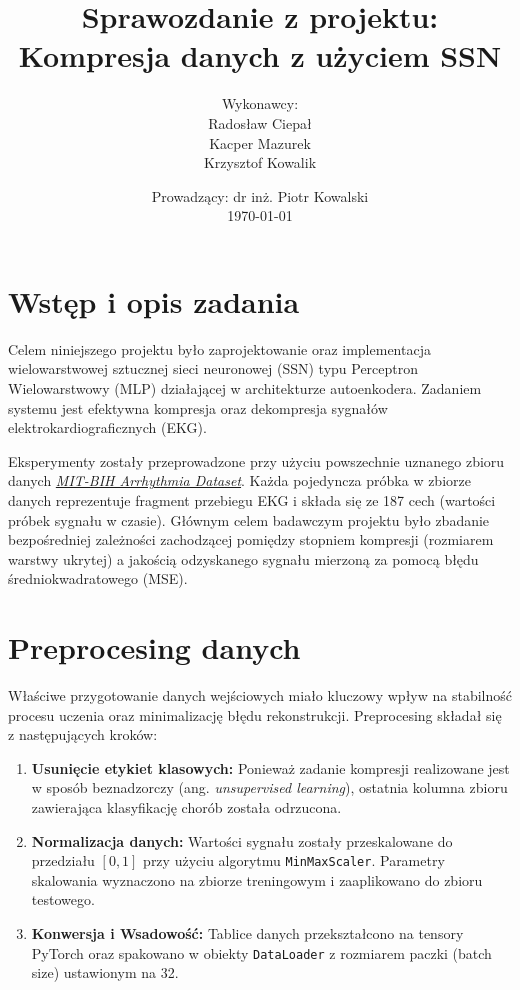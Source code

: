 \documentclass[12pt,a4paper]{article}
\title{Sprawozdanie z projektu:\\Kompresja danych z użyciem SSN}
\author{Wykonawcy: \\
    Radosław Ciepał \\
    Kacper Mazurek \\
    Krzysztof Kowalik}
\date{Prowadzący: dr inż. Piotr Kowalski \\ \today}
\begin{document}
\maketitle
\newpage
\tableofcontents
\newpage

\section{Wstęp i opis zadania}
Celem niniejszego projektu było zaprojektowanie oraz implementacja wielowarstwowej sztucznej sieci neuronowej (SSN) typu Perceptron Wielowarstwowy (MLP) działającej w architekturze autoenkodera. Zadaniem systemu jest efektywna kompresja oraz dekompresja sygnałów elektrokardiograficznych (EKG).

Eksperymenty zostały przeprowadzone przy użyciu powszechnie uznanego zbioru danych \href{https://www.kaggle.com/datasets/shayanfazeli/heartbeat}{\textit{MIT-BIH Arrhythmia Dataset}}. Każda pojedyncza próbka w zbiorze danych reprezentuje fragment przebiegu EKG i składa się ze 187 cech (wartości próbek sygnału w czasie). Głównym celem badawczym projektu było zbadanie bezpośredniej zależności zachodzącej pomiędzy stopniem kompresji (rozmiarem warstwy ukrytej) a jakością odzyskanego sygnału mierzoną za pomocą błędu średniokwadratowego (MSE).

\section{Preprocesing danych}
Właściwe przygotowanie danych wejściowych miało kluczowy wpływ na stabilność procesu uczenia oraz minimalizację błędu rekonstrukcji. Preprocesing składał się z następujących kroków:
\begin{enumerate}
    \item \textbf{Usunięcie etykiet klasowych:} Ponieważ zadanie kompresji realizowane jest w sposób beznadzorczy (ang. \textit{unsupervised learning}), ostatnia kolumna zbioru zawierająca klasyfikację chorób została odrzucona.
    \item \textbf{Normalizacja danych:} Wartości sygnału zostały przeskalowane do przedziału $[0, 1]$ przy użyciu algorytmu \texttt{MinMaxScaler}. Parametry skalowania wyznaczono na zbiorze treningowym i zaaplikowano do zbioru testowego.
    \item \textbf{Konwersja i Wsadowość:} Tablice danych przekształcono na tensory PyTorch oraz spakowano w obiekty \texttt{DataLoader} z rozmiarem paczki (batch size) ustawionym na 32.
\end{enumerate}
\end{document}
